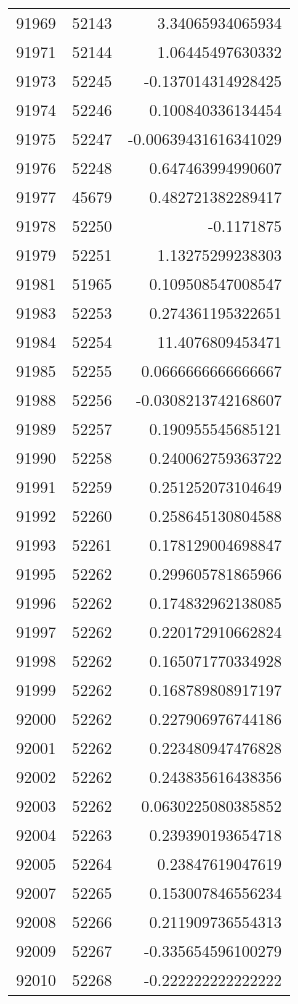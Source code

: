 \begin{tabular}{r | r | r}
91969 & 52143 & 3.34065934065934 \\
91971 & 52144 & 1.06445497630332 \\
91973 & 52245 & -0.137014314928425 \\
91974 & 52246 & 0.100840336134454 \\
91975 & 52247 & -0.00639431616341029 \\
91976 & 52248 & 0.647463994990607 \\
91977 & 45679 & 0.482721382289417 \\
91978 & 52250 & -0.1171875 \\
91979 & 52251 & 1.13275299238303 \\
91981 & 51965 & 0.109508547008547 \\
91983 & 52253 & 0.274361195322651 \\
91984 & 52254 & 11.4076809453471 \\
91985 & 52255 & 0.0666666666666667 \\
91988 & 52256 & -0.0308213742168607 \\
91989 & 52257 & 0.190955545685121 \\
91990 & 52258 & 0.240062759363722 \\
91991 & 52259 & 0.251252073104649 \\
91992 & 52260 & 0.258645130804588 \\
91993 & 52261 & 0.178129004698847 \\
91995 & 52262 & 0.299605781865966 \\
91996 & 52262 & 0.174832962138085 \\
91997 & 52262 & 0.220172910662824 \\
91998 & 52262 & 0.165071770334928 \\
91999 & 52262 & 0.168789808917197 \\
92000 & 52262 & 0.227906976744186 \\
92001 & 52262 & 0.223480947476828 \\
92002 & 52262 & 0.243835616438356 \\
92003 & 52262 & 0.0630225080385852 \\
92004 & 52263 & 0.239390193654718 \\
92005 & 52264 & 0.23847619047619 \\
92007 & 52265 & 0.153007846556234 \\
92008 & 52266 & 0.211909736554313 \\
92009 & 52267 & -0.335654596100279 \\
92010 & 52268 & -0.222222222222222 \\

\end{tabular}
